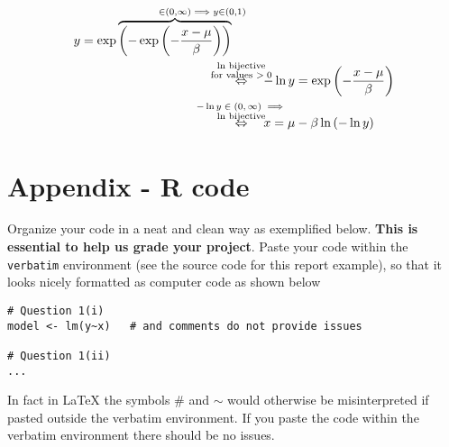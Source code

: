\documentclass[11pt,a4paper]{article}
\begin{document}
\begin{equation}
	\begin{split}
		y = \exp\overbrace{\left(-\exp\left(-\frac{x-\mu}{\beta}\right)\right)}^{\in \left(0, \infty\right) \mathrlap{\implies y \in \left(0, 1\right)}} &\\
		&\overset{\mathclap{\substack{\text{$\ln$ bijective} \\ \text{for values $>0$}}}}\Leftrightarrow \quad -\ln y = \exp\left(-\frac{x-\mu}{\beta}\right) \\
		&\overset{\mathclap{\substack{\text{$-\ln y \in \left(0, \infty\right) \implies$} \\ \text{$\ln$ bijective}}}}\Leftrightarrow \quad x = \mu - \beta \ln \left(-\ln y\right)
	\end{split}
\end{equation}

\newpage  %

\appendix  %

\section*{Appendix - R code}

Organize your code in a neat and clean way as exemplified below. \textbf{This is essential to help us grade your project}.
Paste your code within the \texttt{verbatim} environment (see the source code for this report example), so that it looks nicely formatted as computer code as shown below
\begin{verbatim}
# Question 1(i)
model <- lm(y~x)   # and comments do not provide issues

# Question 1(ii)
...
\end{verbatim}
In fact in {\LaTeX} the symbols \# and $\sim$ would otherwise be misinterpreted if pasted outside the verbatim environment. If you paste the code within the verbatim environment there should be no issues.
\end{document}
